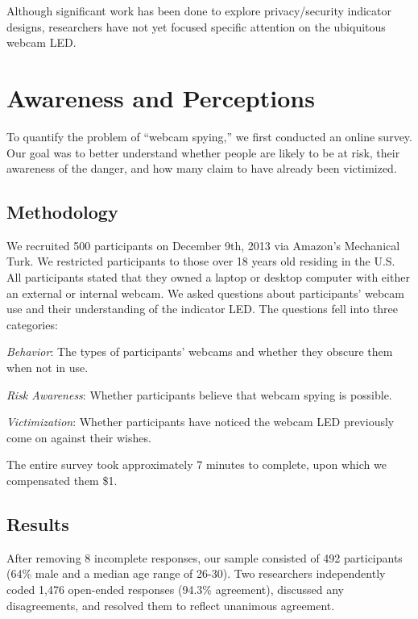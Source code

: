 \documentclass{sigchi}
\newenvironment{packed_enum}{
\begin{enumerate}
  \setlength{\itemsep}{1pt}
  \setlength{\parskip}{0pt}
  \setlength{\parsep}{0pt}
}{\end{enumerate}}
\begin{document}
Although significant work has been done to explore privacy/security indicator designs, researchers have not yet focused specific attention on the ubiquitous webcam LED.


\section{Awareness and Perceptions}
To quantify the problem of ``webcam spying,'' we first conducted an online survey. Our goal was to better understand whether people are likely to be at risk, their awareness of the danger, and how many claim to have already been victimized.

\subsection{Methodology}
We recruited 500 participants on December 9th, 2013 via Amazon's Mechanical Turk. We restricted participants to those over 18 years old residing in the U.S. All participants stated that they owned a laptop or desktop computer with either an external or internal webcam. We asked questions about participants' webcam use and their understanding of the indicator LED. The questions fell into three categories:

\begin{packed_enum}
\item {\it Behavior}: The types of participants' webcams and whether they obscure them when not in use.
\item {\it Risk Awareness}: Whether participants believe that webcam spying is possible.
\item {\it Victimization}: Whether participants have noticed the webcam LED previously come on against their wishes.
\end{packed_enum}

The entire survey took approximately 7 minutes to complete, upon which we compensated them \$1.

\subsection{Results}
After removing 8 incomplete responses, our sample consisted of 492 participants (64\% male and a median age range of 26-30). Two researchers independently coded 1,476 open-ended responses (94.3\% agreement), discussed any disagreements, and resolved them to reflect unanimous agreement.
\end{document}
